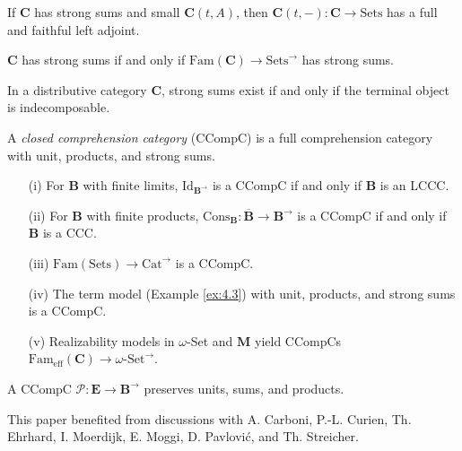 \documentclass{article}
\begin{document}
\begin{lemma}
\label{lem:5.10}
If $\mathbf{C}$ has strong sums and small $\mathbf{C}(t, A)$, then $\mathbf{C}(t, -) : \mathbf{C} \to \text{Sets}$ has a full and faithful left adjoint.
\end{lemma}

\begin{lemma}
\label{lem:5.11}
$\mathbf{C}$ has strong sums if and only if $\text{Fam}(\mathbf{C}) \to \text{Sets}^{\to}$ has strong sums.
\end{lemma}

\begin{proposition}
\label{prop:5.12}
In a distributive category $\mathbf{C}$, strong sums exist if and only if the terminal object is indecomposable.
\end{proposition}

\begin{definition}
\label{def:5.13}
A \emph{closed comprehension category} (CCompC) is a full comprehension category with unit, products, and strong sums.
\end{definition}

\begin{example}
\label{ex:5.14}
\begin{enumerate}
    \item[(i)] For $\mathbf{B}$ with finite limits, $\text{Id}_{\mathbf{B}^{\to}}$ is a CCompC if and only if $\mathbf{B}$ is an LCCC.
    \item[(ii)] For $\mathbf{B}$ with finite products, $\text{Cons}_{\mathbf{B}} : \overline{\mathbf{B}} \to \mathbf{B}^{\to}$ is a CCompC if and only if $\mathbf{B}$ is a CCC.
    \item[(iii)] $\text{Fam}(\text{Sets}) \to \text{Cat}^{\to}$ is a CCompC.
    \item[(iv)] The term model (Example \ref{ex:4.3}) with unit, products, and strong sums is a CCompC.
    \item[(v)] Realizability models in $\omega$-Set and $\mathbf{M}$ yield CCompCs $\text{Fam}_{\text{eff}}(\mathbf{C}) \to \omega\text{-Set}^{\to}$.
\end{enumerate}
\end{example}

\begin{lemma}
\label{lem:5.15}
A CCompC $\mathscr{P} : \mathbf{E} \to \mathbf{B}^{\to}$ preserves units, sums, and products.
\end{lemma}

\begin{acknowledgment}
This paper benefited from discussions with A. Carboni, P.-L. Curien,
Th. Ehrhard, I. Moerdijk, E. Moggi, D. Pavlović, and Th. Streicher.
\end{acknowledgment}
\end{document}
